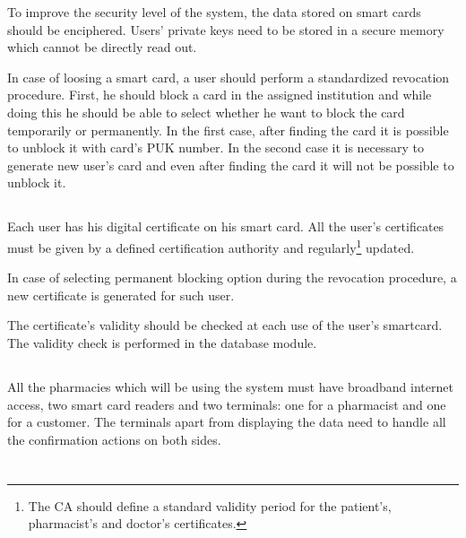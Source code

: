 To improve the security level of the system, the data  stored on smart cards should be enciphered. Users' private keys need to be stored in a secure memory which cannot be directly read out. 

In case of loosing a smart card, a user should perform a standardized revocation procedure. First, he should block a card in the assigned institution and while doing this he should be able to select whether he want to block the card temporarily or permanently. In the first case, after finding the card it is possible to unblock it with card's PUK number. In the second case it is necessary to generate new user's card and even after finding the card it will not be possible to unblock it.


\subsection{}

Each user has his digital certificate on his smart card. All the user's certificates must be given by a defined certification authority and regularly\footnote{The CA should define a standard validity period for the patient's, pharmacist's and doctor's certificates.} updated.

In case of selecting permanent blocking option during the revocation procedure, a new certificate is generated for such user.

The certificate's validity should be checked at each use of the user's smartcard. The validity check is performed in the database module.

\subsection{}

All the pharmacies which will be using the system must have broadband internet access, two smart card readers and two terminals: one for a pharmacist and one for a customer. The terminals apart from displaying the data need to handle all the confirmation actions on both sides. \newline


\section{}


